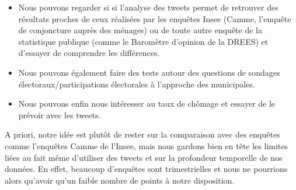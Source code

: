 \documentclass[11pt,french,french]{article}
\begin{document}
\begin{itemize}
\item Nous pouvons regarder si si l’analyse des tweets permet de retrouver des résultats proches de ceux réalisées par les enquêtes Insee (Camme, l’enquête de conjoncture auprès des ménages) ou de toute autre enquête de la statistique publique (comme le Baromètre d’opinion de la DREES) et d’essayer de comprendre les différences. 
\item Nous pouvons également faire des tests autour des questions de sondages électoraux/participations électorales à l’approche des municipales.
\item Nous pouvons enfin nous intéresser au taux de chômage et essayer de le prévoir avec les tweets.
\end{itemize}

A priori, notre idée est plutôt de rester sur la comparaison avec des
enquêtes comme l'enquêtes Camme de l'Insee, mais nous gardons bien en
tête les limites liées au fait même d'utiliser des tweets et sur la
profondeur temporelle de nos données. En effet, beaucoup d'enquêtes sont
trimestrielles et nous ne pourrions alors qu'avoir qu'un faible nombre
de points à notre disposition.
\end{document}

